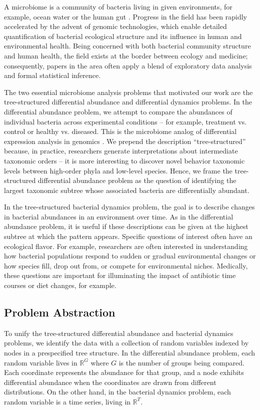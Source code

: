 \documentclass[12pt]{article}
\begin{document}
A microbiome is a community of bacteria living in given environments,
for example, ocean water or the human gut
\citep{human2012structure, cho2012human}. Progress in the field has
been rapidly accelerated by the advent of genomic technologies, which
enable detailed quantification of bacterial ecological structure and its
influence in human and environmental health. Being concerned with both
bacterial community structure and human health, the field exists at the
border between ecology and medicine; consequently, papers in the area
often apply a blend of exploratory data analysis and formal statistical
inference.

The two essential microbiome analysis problems that motivated our work
are the tree-structured differential abundance and differential dynamics
problems. In the differential abundance problem, we attempt to compare
the abundances of individual bacteria across experimental conditions --
for example, treatment vs. control or healthy vs. diseased. This is the
microbiome analog of differential expression analysis in genomics
\citep{anders2010differential}.
We prepend the description ``tree-structured'' because, in practice,
researchers generate interpretations about intermediate taxonomic orders
-- it is more interesting to discover novel behavior taxonomic levels
between high-order phyla and low-level species. Hence, we frame the
tree-structured differential abundance problem as the question of
identifying the largest taxonomic subtree whose associated bacteria are
differentially abundant.

In the tree-structured bacterial dynamics problem, the goal is to
describe changes in bacterial abundances in an environment over time. As
in the differential abundance problem, it is useful if these
descriptions can be given at the highest subtree at which the pattern
appears. Specific questions of interest often have an ecological flavor.
For example, researchers are often interested in understanding how
bacterial populations respond to sudden or gradual environmental changes
or how species fill, drop out from, or compete for environmental niches.
Medically, these questions are important for illuminating the impact of
antibiotic time courses or diet changes, for example.

\subsection{Problem Abstraction}\label{problem-abstraction}

To unify the tree-structured differential abundance and bacterial
dynamics problems, we identify the data with a collection of random
variables indexed by nodes in a prespecified tree structure. In the
differential abundance problem, each random variable lives in
\(\mathbb{R}^{G}\) where \(G\) is the number of groups being compared.
Each coordinate represents the abundance for that group, and a node
exhibits differential abundance when the coordinates are drawn from
different distributions. On the other hand, in the bacterial dynamics
problem, each random variable is a time series, living in
\(\mathbb{R}^{T}\).
\end{document}
